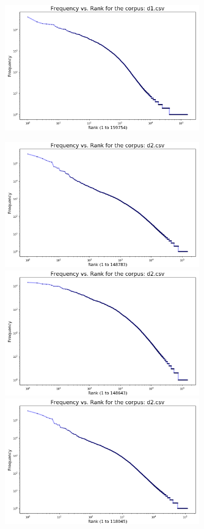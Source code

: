 \documentclass{article}
\begin{document}
\begin{flushleft}
\begin{figure}[H]
\begin{minipage}{0.45\linewidth}
\includegraphics[width=0.75\textwidth]{./images/dataset-1-t1-4.png}
\end{minipage}
\hfill
\begin{minipage}{0.45\linewidth}
\includegraphics[width=0.75\textwidth]{./images/dataset-2-t1-0.png}
\includegraphics[width=0.75\textwidth]{./images/dataset-2-t1-1.png}
\includegraphics[width=0.75\textwidth]{./images/dataset-2-t1-2.png}

\end{minipage}
\end{figure}
\end{flushleft}
\end{document}
